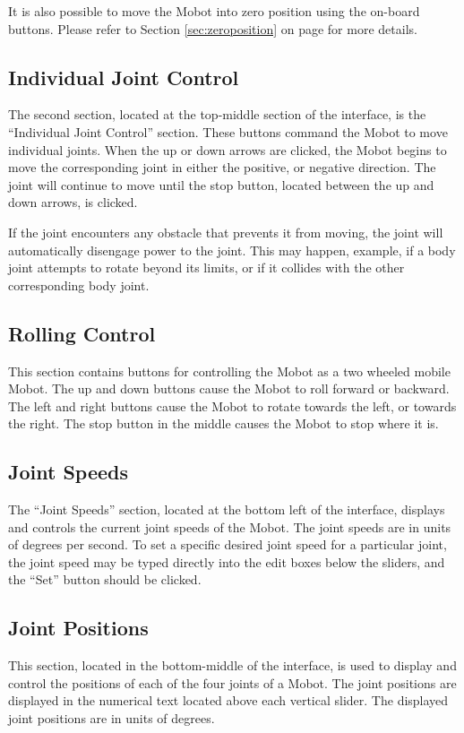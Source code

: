 \documentclass{article}
\begin{document}
It is also possible to move the Mobot into zero position using the
on-board buttons. Please refer to Section \ref{sec:zeroposition} on
page \pageref{sec:zeroposition} for more details.

\subsection{Individual Joint Control}
The second section, located at the top-middle section of the interface,
is the ``Individual Joint Control'' section. These buttons command the
Mobot to move individual joints. When the up or down arrows are clicked,
the Mobot begins to move the corresponding joint in either the positive,
or negative direction. The joint will continue to move until the stop 
button, located between the up and down arrows, is clicked. 

If the joint encounters any obstacle that prevents it from moving, the 
joint will automatically disengage power to the joint. This may happen, 
example, if a body joint attempts to rotate beyond its limits,
or if it collides with the other corresponding body joint. 

\subsection{Rolling Control}
This section contains buttons for controlling the Mobot as a 
two wheeled mobile Mobot. The up and down buttons cause the Mobot to
roll forward or backward. The left and right buttons cause the Mobot 
to rotate towards the left, or towards the right. The stop button in the
middle causes the Mobot to stop where it is.

\subsection{Joint Speeds}
The ``Joint Speeds'' section, located at the bottom left of the interface,
displays and controls the current joint speeds of the Mobot.
The joint speeds are in units of degrees per second. To set a specific 
desired joint speed for a particular joint, the joint speed may be 
typed directly into the edit boxes below the sliders, and the ``Set''
button should be clicked.
 
\subsection{Joint Positions}
This section, located in the bottom-middle of the interface, is used to display
and control the positions of each of the four
joints of a Mobot. The joint positions are displayed in the numerical
text located above each vertical slider. The displayed joint positions are in
units of degrees.  
\end{document}
